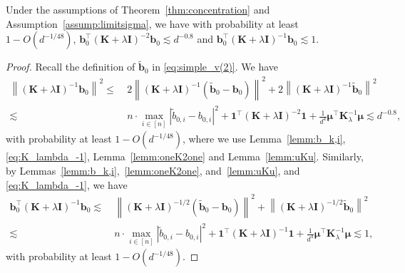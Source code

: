 \documentclass[twoside,11pt]{article}
\newcommand{\norm}[1]{\left\|#1\right\|}
\def\bI{{\mathbf I}}
\newcommand{\ones}{\mathbf{1}}
\def\bK{{\boldsymbol K}}
\def\bb{{\boldsymbol b}}
\renewcommand{\bK}{\boldsymbol{K}}
\newcommand{\vmu}{\mbi{\mu}}
\newcommand{\1}{\mathbf{1}}
\def\mbi#1{\boldsymbol{#1}}
\def\mbi#1{\boldsymbol{#1}} %
\begin{document}
\begin{lemma}\label{lemm:b0Kb0}
Under the assumptions of Theorem~\ref{thm:concentration} and Assumption~\ref{assump:limitsigma}, 
we have  with probability at least $1-O(d^{-1/48})$,
$\bb_0^\top(\bK+\lambda\bI)^{-2}\bb_0\lesssim  d^{-0.8}$ and  $\bb_0^\top(\bK+\lambda\bI)^{-1}\bb_0\lesssim 1$.
\end{lemma}
\begin{proof}
 Recall the definition of $\widetilde \bb_0$ in \eqref{eq:simple_v(2)}. We have
\begin{align}
    \norm{(\bK+\lambda\bI)^{-1}\bb_0}^2\le ~&2\norm{(\bK+\lambda\bI)^{-1}(\widetilde \bb_0 -\bb_0)}^2+2 \norm{(\bK+\lambda\bI)^{-1}\widetilde \bb_0}^2\\
    \lesssim ~& n\cdot \max_{i\in [n]}|\widetilde b_{0,i}-b_{0,i}|^2+\ones^\top(\bK+\lambda\bI)^{-2}\ones + \frac{1}{d^4}  \vmu^\top\bK_{\lambda}^{-1}\vmu\lesssim d^{-0.8},
\end{align}
with probability at least $1-O(d^{-1/48})$, where we use Lemma~\ref{lemm:b_k,i}, \eqref{eq:K_lambda_-1}, Lemma~\ref{lemm:oneK2one} and Lemma~\ref{lemm:uKu}. 
Similarly, by Lemmas~\ref{lemm:b_k,i},~\ref{lemm:oneK2one}, and~\ref{lemm:uKu}, and \eqref{eq:K_lambda_-1}, we have
\begin{align}
    \bb_0^\top(\bK+\lambda\bI)^{-1}\bb_0\lesssim ~&\norm{(\bK+\lambda\bI)^{-1/2}(\widetilde \bb_0 -\bb_0)}^2+\norm{(\bK+\lambda\bI)^{-1/2}\widetilde\bb_0}^2\\
    \lesssim ~& n\cdot \max_{i\in [n]}|\widetilde b_{0,i}-b_{0,i}|^2+\ones^\top(\bK+\lambda\bI)^{-1}\ones+ \frac{1}{d^4}  \vmu^\top\bK_{\lambda}^{-1}\vmu\lesssim 1,
\end{align}
with probability at least $1-O(d^{-1/48})$.
\end{proof}

\end{document}
